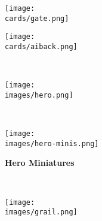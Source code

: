 \begin{figure}[H]
  \centering
  \hfill
  \begin{subfigure}[c]{0.23\linewidth}
    \centering
    \texttt{[image: \\cards/gate.png]}
    \caption{\textbf{}}
  \end{subfigure}
  \hfill
  \begin{subfigure}[c]{0.23\linewidth}
    \centering
    \caption{\textbf{}}
  \end{subfigure}
  \hfill
  \begin{subfigure}[c]{0.23\linewidth}
    \centering
    \texttt{[image: \\cards/aiback.png]}
    \caption{\textbf{}}
  \end{subfigure}
  \hfill
  ~
\end{figure}

\clearpage

\begin{figure}[H]
  \centering
  \begin{subfigure}[c]{0.3\linewidth}
    \texttt{[image: \\images/hero.png]}
    \caption{\textbf{}}
  \end{subfigure}
  ~
  \begin{subfigure}[c]{0.4\linewidth}
    \centering
    \texttt{[image: \\images/hero-minis.png]}
    \caption{\textbf{Hero Miniatures}}
  \end{subfigure}
  ~
  \begin{subfigure}[c]{0.12\linewidth}
    \centering
    \texttt{[image: \\images/grail.png]}
    \caption{\textbf{}}
  \end{subfigure}
\end{figure}

